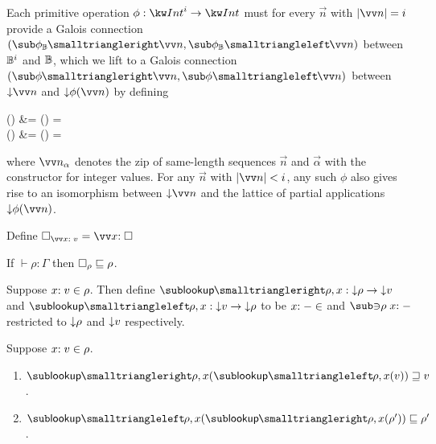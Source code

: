 Each primitive operation $\phi: \tyInt^{i} \to \tyInt$ must for every $\vec{n}$ with $\length{\vec{n}} = i$ provide a Galois connection $(\primFwdBool{\phi}{\vec{n}}, \primBwdBool{\phi}{\vec{n}})$ between $\mathbb{B}^i$ and $\mathbb{B}$, which we lift to a Galois connection $(\primFwd{\phi}{\vec{n}}, \primBwd{\phi}{\vec{n}})$ between $\Below{\vec{n}}$ and $\Below{\phi(\vec{n})}$ by defining
\begin{definition}
\label{def:core-language:primop-gc}
\begin{salign}
   () &= 
   (\vec{\alpha}) = \beta
   \\
   () &= 
   (\beta) = \vec{\alpha}
\end{salign}
\end{definition}

\noindent where $\vec{\annInt{n}{\alpha}}$ denotes the zip of same-length sequences $\vec{n}$ and $\vec{\alpha}$ with the constructor for integer values. For any $\vec{n}$ with $\length{\vec{n}} \numlt i$, any such $\phi$ also gives rise to an isomorphism between $\Below{\vec{n}}$ and the lattice of partial applications $\Below{\exPrimOp{\phi}{\vec{n}}}$.




\begin{definition}
Define $\hole_{\vec{\bind{x}{v}}} = \vec{\bind{x}{\hole}}$
\end{definition}

\begin{lemma}
\label{lem:core-language:hole-env}If $\vdash \rho: \Gamma$ then $\square_{\rho} \sqsubseteq \rho$.
\end{lemma}

\begin{definition}
   Suppose $x{:}\;v\in{\rho}$. Then define $\envLookupFwdF{\rho,x}: \Below{\rho} \to \Below{v}$ and $\envLookupBwdF{\rho,x}: \Below{v} \to \Below{\rho}$ to be $x{:}\;-\in$ and $\envLookupBwdR{\rho}\bind{x}{-}$ restricted to ${\downarrow}{\rho}$ and ${\downarrow}{v}$ respectively.
\end{definition}

\begin{lemma}
\label{lem:core-language:env-get-put}Suppose $x{:}\;v\in{\rho}$.
\begin{enumerate}
   \item \label{lem:core-language:env-get-put:1} $\envLookupFwdF{\rho,x}(\envLookupBwdF{\rho,x}(v)) \geq v$.
   \item \label{lem:core-language:env-get-put:2} $\envLookupBwdF{\rho,x}(\envLookupFwdF{\rho,x}(\rho')) \leq \rho'$.
\end{enumerate}
\end{lemma}

